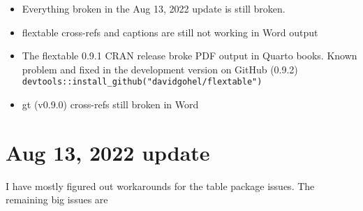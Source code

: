 \documentclass[
  letterpaper,
  oneside]{scrbook}
\providecommand{\tightlist}{%
  \setlength{\itemsep}{0pt}\setlength{\parskip}{0pt}}\usepackage{longtable,booktabs,array}
\begin{document}
\begin{itemize}
\tightlist
\item
  Everything broken in the Aug 13, 2022 update is still broken.
\item
  flextable cross-refs and captions are still not working in Word output
\item
  The flextable 0.9.1 CRAN release broke PDF output in Quarto books.
  Known problem and fixed in the development version on GitHub (0.9.2)
  \texttt{devtools::install\_github("davidgohel/flextable")}
\item
  gt (v0.9.0) cross-refs still broken in Word
\end{itemize}

\hypertarget{aug-13-2022-update}{%
\section{Aug 13, 2022 update}\label{aug-13-2022-update}}

I have mostly figured out workarounds for the table package issues. The
remaining big issues are
\end{document}
